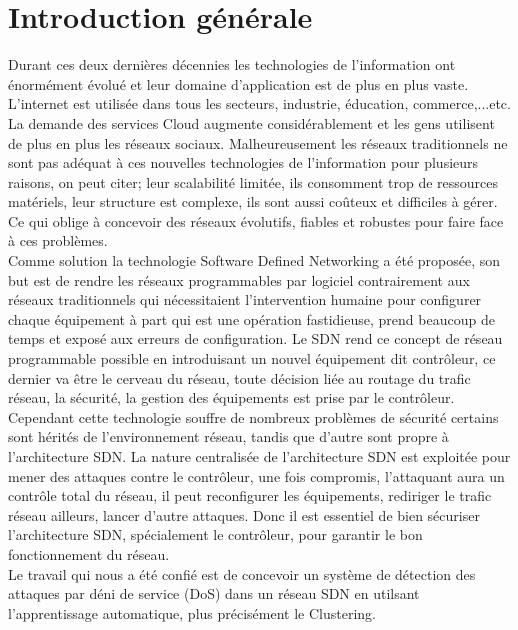 
\chapter{Introduction générale} 

\label{Introduction} 
Durant ces deux dernières décennies les technologies de l’information ont  énormément évolué et leur domaine d’application est de plus en plus vaste. L’internet est utilisée dans tous les secteurs, industrie, éducation, commerce,...etc. La demande des services Cloud augmente considérablement et les gens utilisent de plus en plus les réseaux sociaux. Malheureusement les réseaux traditionnels ne sont pas adéquat à ces nouvelles technologies de l’information  pour plusieurs raisons, on peut citer; leur scalabilité limitée, ils consomment trop de ressources matériels,  leur structure est complexe, ils sont aussi coûteux et difficiles à gérer.  Ce qui oblige à concevoir des réseaux évolutifs, fiables et robustes pour faire face à ces problèmes.\\

	Comme solution la technologie Software Defined Networking a été proposée, son but est de rendre les réseaux programmables par logiciel contrairement aux réseaux traditionnels qui nécessitaient l’intervention humaine  pour configurer chaque équipement à part qui est une opération fastidieuse, prend beaucoup de temps et exposé aux erreurs de configuration. Le SDN rend ce concept de réseau programmable possible en introduisant un nouvel équipement dit contrôleur, ce dernier va être le cerveau du réseau, toute décision liée au routage du trafic réseau, la sécurité, la gestion des équipements est prise par le contrôleur.\\
	
	Cependant cette technologie souffre de nombreux problèmes de sécurité certains sont hérités de l’environnement réseau, tandis que d’autre sont propre à l’architecture SDN. La nature centralisée de l’architecture SDN est exploitée pour mener des attaques contre le contrôleur, une fois compromis, l’attaquant aura un contrôle total du réseau, il peut reconfigurer les équipements, rediriger le trafic réseau ailleurs, lancer d’autre attaques. Donc il est essentiel de bien sécuriser l'architecture SDN, spécialement le contrôleur, pour garantir le bon fonctionnement du réseau.\\
	
	Le travail qui nous a été confié est de concevoir un système de détection des attaques par déni de service (DoS) dans un réseau SDN en utilsant l'apprentissage automatique, plus précisément le Clustering.\\
		

